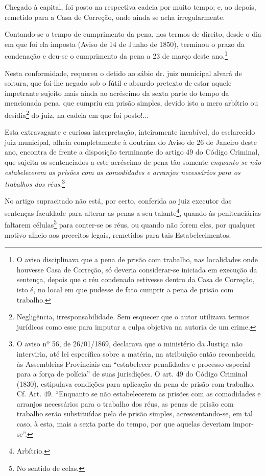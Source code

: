 Chegado à capital, foi posto na respectiva cadeia por muito tempo; e, ao
depois, remetido para a Casa de Correção, onde ainda se acha
irregularmente.

Contando-se o tempo de cumprimento da pena, nos termos de direito, desde
o dia em que foi ela imposta (Aviso de 14 de Junho de 1850), terminou o
prazo da condenação e deu-se o cumprimento da pena a 23 de março deste
ano.\footnote{O aviso disciplinava que a pena de prisão com trabalho,
  nas localidades onde houvesse Casa de Correção, só deveria
  considerar-se iniciada em execução da sentença, depois que o réu
  condenado estivesse dentro da Casa de Correção, isto é, no local em
  que pudesse de fato cumprir a pena de prisão com trabalho.}

Nesta conformidade, requereu o detido ao sábio dr. juiz municipal alvará
de soltura, que foi-lhe negado sob o fútil e absurdo pretexto de estar
aquele impetrante sujeito mais ainda ao acréscimo da sexta parte do
tempo da mencionada pena, que cumpriu em prisão simples, devido isto a
mero arbítrio ou desídia\footnote{Negligência, irresponsabilidade. Sem
  esquecer que o autor utilizava termos jurídicos como esse para imputar
  a culpa objetiva na autoria de um crime.} do juiz, na cadeia em que
foi posto!...

Esta extravagante e curiosa interpretação, inteiramente incabível, do
esclarecido juiz municipal, alheia completamente à doutrina do Aviso de
26 de Janeiro deste ano, encontra de frente a disposição terminante do
artigo 49 do Código Criminal, que sujeita os sentenciados a este
acréscimo de pena tão somente \emph{enquanto se não estabelecerem as
prisões com as comodidades e arranjos necessários para os trabalhos dos
réus}.\footnote{O aviso nº 56, de 26/01/1869, declarava que o
  ministério da Justiça não interviria, até lei específica sobre a
  matéria, na atribuição então reconhecida às Assembleias Provinciais em
  ``estabelecer penalidades e processo especial para a força de polícia''
  de suas jurisdições. O art. 49 do Código Criminal (1830), estipulava
  condições para aplicação da pena de prisão com trabalho. Cf. Art. 49.
  ``Enquanto se não estabelecerem as prisões com as comodidades e
  arranjos necessários para o trabalho dos réus, as penas de prisão com
  trabalho serão substituídas pela de prisão simples, acrescentando-se,
  em tal caso, à esta, mais a sexta parte do tempo, por que aquelas
  deveriam impor-se''.}

No artigo supracitado não está, por certo, conferida ao juiz executor
das sentenças faculdade para alterar as penas a seu talante\footnote{
  Arbítrio.}, quando às penitenciárias faltarem células\footnote{No
  sentido de celas.} para conter-se os réus, ou quando não forem eles,
por qualquer motivo alheio aos preceitos legais, remetidos para tais
Estabelecimentos.

